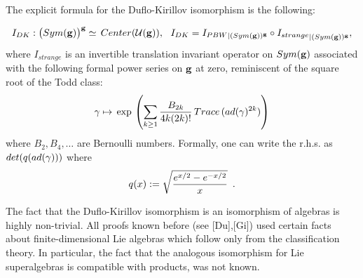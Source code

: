                           The explicit formula for the Duflo-Kirillov
                           isomorphism
                           is the following: 
                            
                          $$I_{DK}
                          :\bigl(Sym({\bf g})\bigr)^{{\bf g}}
                         \simeq \,Center( {\cal U}({\bf g})),
                          \,\,\,\, I_{DK}= {I_{PBW}}_
                          {|(Sym({\bf g}))^{{\bf g}}}  
                          \circ {I_{strange}}_{
                        |(Sym({\bf g}))^{{\bf g}}  },
                          $$
                           where 
                          $I_{strange}$ 
                              is an invertible translation invariant
                              operator on
                             $Sym({\bf g})$ 
              associated with the following
               formal power series on ${\bf g}$ at zero,
               reminiscent of the 
                      square root of the Todd class:
                     $${\gamma}\mapsto \,{\rm exp}\,
                       \left(\sum_{k\ge 1} {B_{2k}\over 4 k (2k)!}\, Trace \,
                     (ad({\gamma})^{2k})\right) $$
                     where $B_2,B_4,\dots$ are Bernoulli numbers.
                      Formally, one can write
                       the r.h.s. as
                       $det(q(ad({\gamma})))$ where
                       $$q(x):=\sqrt{ {e^{x/2}-e^{-x/2}\over x}}\,\,\,.$$ 
                       
                     
                     The fact that the Duflo-Kirillov
                      isomorphism is an isomorphism
                      of algebras is highly non-trivial. All proofs known
                       before (see [Du],[Gi]) used 
                        certain facts about finite-dimensional Lie algebras
                        which follow only from the classification theory.
                        In particular, the fact that the analogous isomorphism
                         for Lie superalgebras
                        is compatible with products, was not known.
                         
